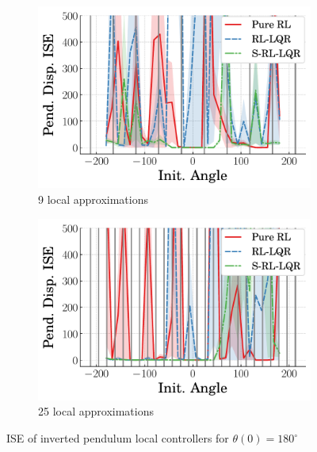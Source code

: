 \begin{figure}
     \centering
     \begin{subfigure}[b]{0.49\textwidth}
         \centering
         \includegraphics[width=\textwidth]{figures/figures_Interpretability/Mean_ISE_Inverted_Pendulum-v0_cubic_9_bins/Mean_ISE_Inverted_Pendulum-v0_cubic_Pend_Disp_9_bins}
         \caption{9 local approximations}
         \label{subfig_chap5:inv_pend_angle_unclipped_approx_error_9_bins}
     \end{subfigure}
     \hfill
     \begin{subfigure}[b]{0.49\textwidth}
         \centering
         \includegraphics[width=\textwidth]{figures/figures_Interpretability/Mean_ISE_Inverted_Pendulum-v0_cubic_25_bins/Mean_ISE_Inverted_Pendulum-v0_cubic_Pend_Disp_25_bins}
         \caption{25 local approximations}
         \label{subfig_chap5:inv_pend_angle_unclipped_approx_error_25_bins}
     \end{subfigure}
        \caption{ISE of inverted pendulum local controllers for $\theta(0)=180^\circ$}
        \label{fig_chap5:inv_pend_angle_unclipped_approx_error}
\end{figure}

